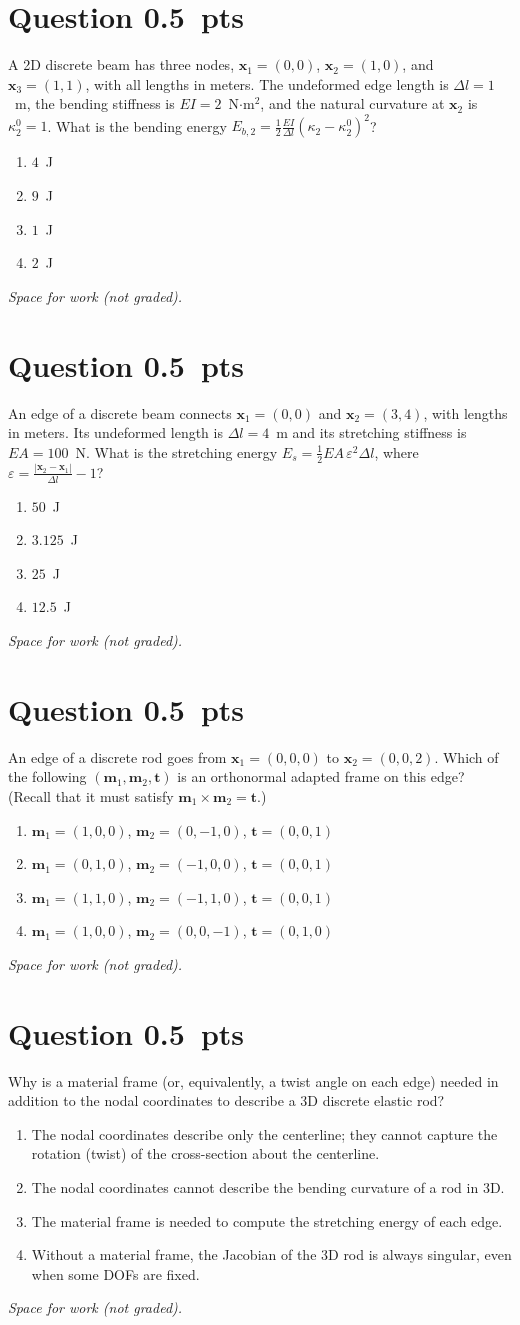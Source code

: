 \documentclass[letterpaper,11pt]{article}
\newcounter{qnum}
\newcommand{\qpts}{0.5}
\newcommand{\mcq}[5]{%
  \clearpage
  \stepcounter{qnum}%
  \section*{Question \theqnum \hfill \normalsize \qpts~pts}
  #1
  \begin{enumerate}[label=(\alph*)]
    \item #2
    \item #3
    \item #4
    \item #5
  \end{enumerate}
  \vspace{3mm}

  \textit{Space for work (not graded).}
}
\begin{document}
%
%
\mcq{A 2D discrete beam has three nodes, $\mathbf{x}_1 = (0, 0)$, $\mathbf{x}_2 = (1, 0)$, and $\mathbf{x}_3 = (1, 1)$, with all lengths in meters. The undeformed edge length is $\Delta l = 1$~m, the bending stiffness is $EI = 2$~N$\cdot$m$^2$, and the natural curvature at $\mathbf{x}_2$ is $\kappa^0_2 = 1$. What is the bending energy $E_{b,2} = \frac{1}{2} \frac{EI}{\Delta l} (\kappa_2 - \kappa^0_2)^2$?}
  {$4$~J}
  {$9$~J}
  {$1$~J}
  {$2$~J}

%
%
\mcq{An edge of a discrete beam connects $\mathbf{x}_1 = (0, 0)$ and $\mathbf{x}_2 = (3, 4)$, with lengths in meters. Its undeformed length is $\Delta l = 4$~m and its stretching stiffness is $EA = 100$~N. What is the stretching energy $E_s = \frac{1}{2} EA \, \varepsilon^2 \Delta l$, where $\varepsilon = \frac{|\mathbf{x}_2 - \mathbf{x}_1|}{\Delta l} - 1$?}
  {$50$~J}
  {$3.125$~J}
  {$25$~J}
  {$12.5$~J}

%
%
\mcq{An edge of a discrete rod goes from $\mathbf{x}_1 = (0, 0, 0)$ to $\mathbf{x}_2 = (0, 0, 2)$. Which of the following $(\mathbf{m}_1, \mathbf{m}_2, \mathbf{t})$ is an orthonormal adapted frame on this edge? (Recall that it must satisfy $\mathbf{m}_1 \times \mathbf{m}_2 = \mathbf{t}$.)}
  {$\mathbf{m}_1 = (1, 0, 0)$, $\mathbf{m}_2 = (0, -1, 0)$, $\mathbf{t} = (0, 0, 1)$}
  {$\mathbf{m}_1 = (0, 1, 0)$, $\mathbf{m}_2 = (-1, 0, 0)$, $\mathbf{t} = (0, 0, 1)$}
  {$\mathbf{m}_1 = (1, 1, 0)$, $\mathbf{m}_2 = (-1, 1, 0)$, $\mathbf{t} = (0, 0, 1)$}
  {$\mathbf{m}_1 = (1, 0, 0)$, $\mathbf{m}_2 = (0, 0, -1)$, $\mathbf{t} = (0, 1, 0)$}

%
%
\mcq{Why is a material frame (or, equivalently, a twist angle on each edge) needed in addition to the nodal coordinates to describe a 3D discrete elastic rod?}
  {The nodal coordinates describe only the centerline; they cannot capture the rotation (twist) of the cross-section about the centerline.}
  {The nodal coordinates cannot describe the bending curvature of a rod in 3D.}
  {The material frame is needed to compute the stretching energy of each edge.}
  {Without a material frame, the Jacobian of the 3D rod is always singular, even when some DOFs are fixed.}
\end{document}
